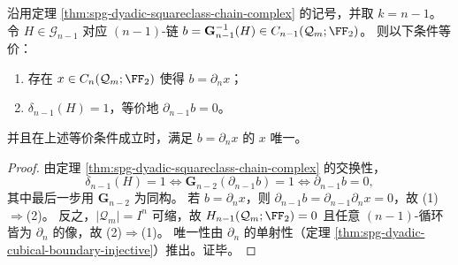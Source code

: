 \begin{corollary}\label{cor:spg-dyadic-boundary-syndrome-fillability}
沿用定理 \ref{thm:spg-dyadic-squareclass-chain-complex} 的记号，并取 \(k=n-1\)。
令 \(H\in\mathcal G_{n-1}\) 对应 \((n-1)\)-链 \(b=\mathbf G_{n-1}^{-1}(H)\in C_{n-1}(\mathcal Q_m;\FF_2)\)。
则以下条件等价：
\begin{enumerate}
  \item 存在 \(x\in C_n(\mathcal Q_m;\FF_2)\) 使得 \(b=\partial_n x\)；
  \item \(\delta_{n-1}(H)=1\)，等价地 \(\partial_{n-1}b=0\)。
\end{enumerate}
并且在上述等价条件成立时，满足 \(b=\partial_n x\) 的 \(x\) 唯一。
\end{corollary}
\begin{proof}
由定理 \ref{thm:spg-dyadic-squareclass-chain-complex} 的交换性，
\[
\delta_{n-1}(H)=1
\iff
\mathbf G_{n-2}(\partial_{n-1}b)=1
\iff
\partial_{n-1}b=0,
\]
其中最后一步用 \(\mathbf G_{n-2}\) 为同构。
若 \(b=\partial_n x\)，则 \(\partial_{n-1}b=\partial_{n-1}\partial_n x=0\)，故 (1)\(\Rightarrow\)(2)。
反之，\(|\mathcal Q_m|=I^n\) 可缩，故 \(H_{n-1}(\mathcal Q_m;\FF_2)=0\) 且任意 \((n-1)\)-循环皆为 \(\partial_n\) 的像，故 (2)\(\Rightarrow\)(1)。
唯一性由 \(\partial_n\) 的单射性（定理 \ref{thm:spg-dyadic-cubical-boundary-injective}）推出。证毕。
\end{proof}

